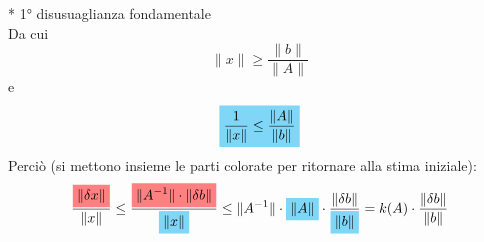 * 1° disusuaglianza fondamentale\\
Da cui
\begin{displaymath}
    \lVert x \rVert \geq \frac{\lVert b \rVert}{\lVert A \rVert}
\end{displaymath}
e
\begin{displaymath}
    \highlightCYAN{\frac{1}{\lVert x \rVert} \leq \frac{\lVert A \rVert}{\lVert b \rVert}}
\end{displaymath}
Perciò (si mettono insieme le parti colorate per ritornare alla stima iniziale):
\begin{displaymath}
    \frac{\highlightRED{\lVert \delta x \rVert }}{\lVert x \rVert } \leq \frac{\highlightRED{\lVert A^{-1} \rVert \cdot \lVert \delta b \rVert }}{\highlightCYAN{\lVert x \rVert }} \leq \lVert A^{-1} \rVert  \cdot \highlightCYAN{\lVert A \rVert} \cdot \frac{\lVert \delta b \rVert }{\highlightCYAN{\lVert b \rVert }} = k(A)\cdot \frac{\lVert \delta b \rVert }{\lVert b \rVert }
\end{displaymath}